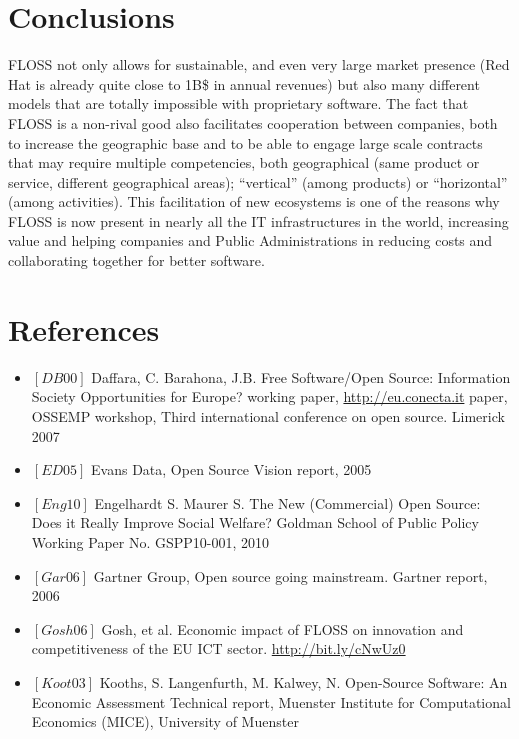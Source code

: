 \section*{Conclusions}

FLOSS not only allows for sustainable, and even very large market presence
(Red Hat is already quite close to 1B\$ in annual revenues) but also many
different models that are totally impossible with proprietary software. The fact
that FLOSS is a non-rival good also facilitates cooperation between
companies, both to increase the geographic base and to be able to engage large
scale contracts that may require multiple competencies, both geographical (same
product or service, different geographical areas); ``vertical'' (among products)
or ``horizontal'' (among activities). This facilitation of new ecosystems is one
of the reasons why FLOSS is now present in nearly all
the IT infrastructures in the world, increasing value and helping companies and
Public Administrations in reducing costs and collaborating together for better
software.

\section*{References}

\begin{itemize}
 \item $[DB 00]$ Daffara, C. Barahona, J.B. Free Software/Open Source: Information
Society Opportunities for Europe? working paper, \url{http://eu.conecta.it}
paper, OSSEMP workshop, Third international conference on open source. Limerick 2007
 \item $[ED 05]$ Evans Data, Open Source Vision report, 2005 
 \item $[Eng 10]$ Engelhardt S. Maurer S. The New (Commercial) Open Source: Does it
Really Improve Social Welfare? Goldman School of Public Policy Working Paper
No. GSPP10-001, 2010
 \item $[Gar 06]$ Gartner Group, Open source going mainstream. Gartner report, 2006
 \item $[Gosh 06]$ Gosh, et al. Economic impact of FLOSS on innovation and
competitiveness of the EU ICT sector.
\url{http://bit.ly/cNwUz0}
 \item $[Koot 03]$ Kooths, S. Langenfurth, M. Kalwey, N. Open-Source Software:
An Economic Assessment Technical report, Muenster Institute for Computational Economics
(MICE), University of Muenster
\end{itemize}
